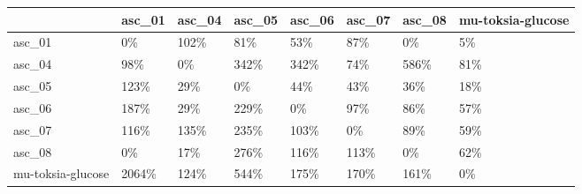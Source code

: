 \begin{tabular}{llllllll}
\toprule
{} & asc\_01 & asc\_04 & asc\_05 & asc\_06 & asc\_07 & asc\_08 & mu-toksia-glucose \\
\midrule
asc\_01            &     0\% &   102\% &    81\% &    53\% &    87\% &     0\% &                5\% \\
asc\_04            &    98\% &     0\% &   342\% &   342\% &    74\% &   586\% &               81\% \\
asc\_05            &   123\% &    29\% &     0\% &    44\% &    43\% &    36\% &               18\% \\
asc\_06            &   187\% &    29\% &   229\% &     0\% &    97\% &    86\% &               57\% \\
asc\_07            &   116\% &   135\% &   235\% &   103\% &     0\% &    89\% &               59\% \\
asc\_08            &     0\% &    17\% &   276\% &   116\% &   113\% &     0\% &               62\% \\
mu-toksia-glucose &  2064\% &   124\% &   544\% &   175\% &   170\% &   161\% &                0\% \\
\bottomrule
\end{tabular}
